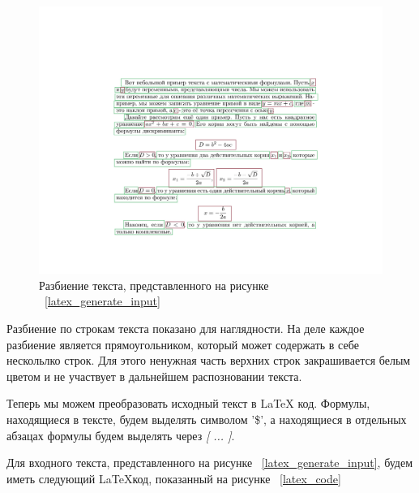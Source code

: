 \begin{figure}
    \includegraphics[scale=0.75]{img/latex_generation/segmented.jpg}
    \caption{Разбиение текста, представленного на рисунке ~\ref{latex_generate_input}}
    \label{latex_segmentation}
\end{figure}

Разбиение по строкам текста показано для наглядности. На деле каждое разбиение является прямоугольником, который может содержать в себе нескольлко строк. Для этого ненужная часть верхних строк закрашивается белым цветом и не участвует в дальнейшем распозновании текста.

Теперь мы можем преобразовать исходный текст в \LaTeX\; код. Формулы, находящиеся в тексте, будем выделять символом '\$', а находящиеся в отдельных абзацах формулы будем выделять через \textit{[ ... ]}.

Для входного текста, представленного на рисунке ~\ref{latex_generate_input}, будем иметь следующий \LaTeX\;код, показанный на рисунке ~\ref{latex_code}

